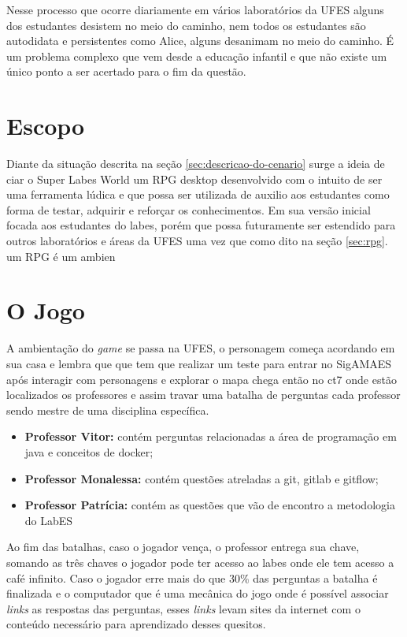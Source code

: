 Nesse processo que ocorre diariamente em vários laboratórios da UFES alguns dos estudantes desistem no meio do caminho, nem todos os estudantes são autodidata e persistentes como Alice, alguns desanimam no meio do caminho. É um problema complexo que vem desde a educação infantil e que não existe um único ponto a ser acertado para o fim da questão. 

\section{Escopo}
Diante da situação descrita na seção \ref{sec:descricao-do-cenario} surge a ideia de ciar o Super Labes World um RPG desktop desenvolvido com o intuito de ser uma ferramenta lúdica e que possa ser utilizada de auxilio aos estudantes como forma de testar, adquirir e reforçar os conhecimentos. Em sua versão inicial focada aos estudantes do labes, porém que possa futuramente ser estendido para outros laboratórios e áreas da UFES uma vez que como dito na seção \ref{sec:rpg}. um RPG é um ambien

\section{O Jogo}
A ambientação do \textit{game} se passa na UFES, o personagem começa acordando em sua casa e lembra que que tem que realizar um teste para entrar no SigAMAES após interagir com personagens e explorar o mapa chega então no ct7 onde estão localizados os professores e assim travar uma batalha de perguntas cada professor sendo mestre de uma disciplina específica.
\begin{itemize}
    \item \textbf{Professor Vitor: }contém perguntas relacionadas a área de programação em java e conceitos de docker;
    \item \textbf{Professor Monalessa: }contém questões atreladas a git, gitlab e gitflow;
    \item \textbf{Professor Patrícia: } contém as questões que vão de encontro a metodologia do LabES
\end{itemize}
Ao fim das batalhas, caso o jogador vença, o professor entrega sua chave, somando as três chaves o jogador pode ter acesso ao labes onde ele tem acesso a café infinito.
Caso o jogador erre mais do que 30\% das perguntas a batalha é finalizada e o computador que é uma mecânica do jogo onde é possível associar  \textit{links} as respostas das perguntas, esses \textit{links} levam sites da internet com o conteúdo necessário para aprendizado desses quesitos.

